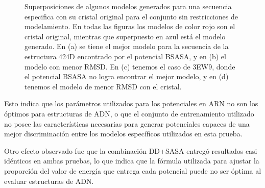 \begin{figure}[!p]
\caption[Superposiciones con el cristal original de algunos de los mejores modelos de ADN encontrados según los potenciales, para el conjunto generado sin restricciones]{Superposiciones de algunos modelos generados para una secuencia especifica con su cristal original para el conjunto sin restricciones de modelamiento. En todas las figuras los modelos de color rojo son el cristal original, mientras que superpuesto en azul está el modelo generado. En (a) se tiene el mejor modelo para la secuencia de la estructura 424D encontrado por el potencial BSASA, y en (b) el modelo con menor RMSD. En (c) tenemos el caso de 3EW9, donde el potencial BSASA no logra encontrar el mejor modelo, y en (d) tenemos el modelo de menor RMSD con el cristal.}
\label{fig:dnatest2}
\end{figure}

Esto indica que los parámetros utilizados para los potenciales en ARN no son los óptimos para estructuras de ADN, o que el conjunto de entrenamiento utilizado no posee las características necesarias para generar potenciales capaces de una mejor discriminación entre los modelos específicos utilizados en esta prueba.

Otro efecto observado fue que la combinación DD+SASA entregó resultados casi idénticos en ambas pruebas, lo que indica que la fórmula utilizada para ajustar la proporción del valor de energía que entrega cada potencial puede no ser óptima al evaluar estructuras de ADN. 
